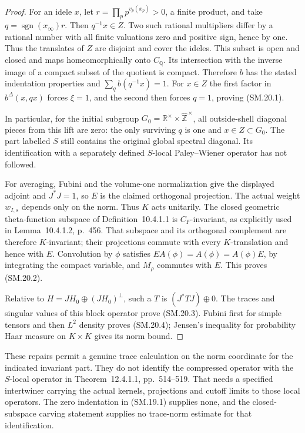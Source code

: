 \begin{proof}
For an idele $x$, let $r=\prod_p p^{v_p(x_p)}>0$, a finite
product, and take $q=\operatorname{sgn}(x_\infty)r$.
Then $q^{-1}x\in Z$.  Two such rational multipliers differ
by a rational number with all finite valuations zero and
positive sign, hence by one.  Thus the translates of $Z$
are disjoint and cover the ideles.  This subset is open
and closed and maps homeomorphically onto $C_{\mathbb Q}$.
Its intersection with the inverse image of a compact subset
of the quotient is compact.  Therefore $b$ has the stated
indentation properties and $\sum_qb(q^{-1}x)=1$.
For $x\in Z$ the first factor in $b^\Delta(x,qx)$ forces
$\xi=1$, and the second then forces $q=1$, proving (SM.20.1).

In particular, for the initial subgroup
$G_0=\mathbb R^\times\times\widehat{\mathbb Z}^{\,\times}$,
all outside-shell diagonal pieces from this lift are zero:
the only surviving $q$ is one and $x\in Z\subset G_0$.
The part labelled $S$ still contains the original global
spectral diagonal.  Its identification with a separately
defined $S$-local Paley--Wiener operator has not followed.

For averaging, Fubini and the volume-one normalization give
the displayed adjoint and $J^*J=1$, so $E$ is the claimed
orthogonal projection.  The actual weight $w_{I,s}$ depends
only on the norm.  Thus $K$ acts unitarily.
The closed geometric theta-function subspace of
Definition~10.4.1.1 is $C_F$-invariant, as explicitly used
in Lemma~10.4.1.2, p.~456.  That subspace and its orthogonal
complement are therefore $K$-invariant; their projections
commute with every $K$-translation and hence with $E$.
Convolution by $\phi$ satisfies
$EA(\phi)=A(\phi)=A(\phi)E$, by integrating the compact
variable, and $M_\rho$ commutes with $E$.  This proves
(SM.20.2).

Relative to $H=JH_0\oplus(JH_0)^\perp$, such a $T$ is
$(J^*TJ)\oplus0$.  The traces and singular values of this
block operator prove (SM.20.3).  Fubini first for simple
tensors and then $L^2$ density proves (SM.20.4); Jensen's
inequality for probability Haar measure on $K\times K$
gives its norm bound.
\end{proof}

These repairs permit a genuine trace calculation on the norm
coordinate for the indicated invariant part.  They do not
identify the compressed operator with the $S$-local operator
in Theorem~12.4.1.1, pp.~514--519.  That needs a specified
intertwiner carrying the actual kernels, projections and cutoff
limits to those local operators.  The zero indentation in
(SM.19.1) supplies none, and the closed-subspace carving
statement supplies no trace-norm estimate for that identification.

